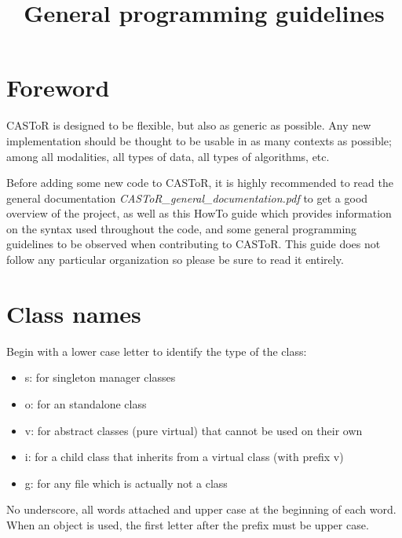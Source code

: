 \documentclass[a4paper, 11pt]{article}
\begin{document}
\title{General programming guidelines}
\maketitle

\section*{Foreword}

CASToR is designed to be flexible, but also as generic as possible.
Any new implementation should be thought to be usable in as many contexts as possible; among all modalities, all types of data, all types of algorithms, etc.

Before adding some new code to CASToR, it is highly recommended to read the general documentation \textit{CASToR\_general\_documentation.pdf} to get a good overview of the project, as well as this HowTo guide which provides information on the syntax used throughout the code, and some general programming guidelines to be observed when contributing to CASToR.
This guide does not follow any particular organization so please be sure to read it entirely.

\section{Class names}

Begin with a lower case letter to identify the type of the class:
\begin{itemize}
  \item s: for singleton manager classes
  \item o: for an standalone class
  \item v: for abstract classes (pure virtual) that cannot be used on their own
  \item i: for a child class that inherits from a virtual class (with prefix v)
  \item g: for any file which is actually not a class
\end{itemize}
No underscore, all words attached and upper case at the beginning of each word.
When an object is used, the first letter after the prefix must be upper case.
\end{document}
